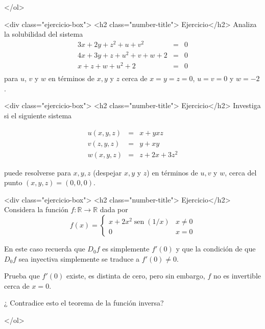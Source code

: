 \documentclass{article}
\theoremstyle{definition}
\newcommand{\sen}{\operatorname{sen}}
\begin{document}
          </ol>


        <div class="ejercicio-box"> <h2 class="number-title"> Ejercicio</h2> Analiza la solubilidad del sistema
          \begin{eqnarray*}
            3x+2y+z^2+u+v^2&=&0\\
            4x+3y+z+u^2+v+w+2&=&0\\
            x+z+w+u^2+2&=&0\\
          \end{eqnarray*}
          para $u$, $v$ y $w$ en términos de $x,y$ y $z$ cerca de $x=y=z=0$,
          $u=v=0$ y $w=-2$.

        <div class="ejercicio-box"> <h2 class="number-title"> Ejercicio</h2> Investiga si el siguiente sistema

          \begin{eqnarray*}
            u(x,y,z)&=&x+yxz \\
            v(z,y,z)&=&y+xy\\
            w(x,y,z)&=&z+2x+3z^2
          \end{eqnarray*}

          puede resolverse para $x,y,z$ (despejar $x,y$ y $z$) en términos
          de $u,v$ y $w$, cerca del punto $(x,y,z)=(0,0,0)$.
          
        <div class="ejercicio-box"> <h2 class="number-title"> Ejercicio</h2> Considera la función $f:\mathbb{R}\to \mathbb{R}$ dada por
          $$
          f(x)=\left\{
            \begin{array}{cc}
              x+2x^2\sen(1/x) & x\ne 0 \\
              0 & x=0
              \end{array}
            \right.
          $$

          En este caso recuerda que $D_0f$ es simplemente $f'(0)$ y que
          la condición de que $D_0f$ sea inyectiva simplemente se traduce
          a $f'(0)\ne0$.

          Prueba que $f'(0)$ existe, es distinta de cero, pero sin embargo,
          $f$ no es invertible cerca de $x=0$.

          ¿ Contradice esto el teorema de la función inversa?
            
          </ol>
          

          

	
  
       
\end{document}
